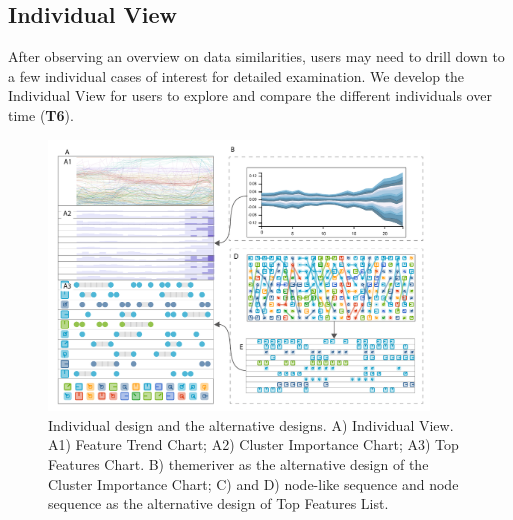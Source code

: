 \subsection{Individual View}
After observing an overview on data similarities, users may need to drill down to a few individual cases of interest for detailed examination.
We develop the Individual View for users to explore and compare the different individuals over time (\textbf{T6}).


\begin{figure}[t]
	\centering
    \includegraphics[width=0.90\textwidth]{figure/MultiRNNExplorer/design/alternative_design.pdf}
	\vspace{-3mm}
	\caption{Individual design and the alternative designs. A) Individual View. A1) Feature Trend Chart; A2) Cluster Importance Chart; A3) Top Features Chart. B) themeriver as the alternative design of the Cluster Importance Chart; C) and D) node-like sequence and node sequence as the alternative design of Top Features List.}
	\label{fig:individual_view}
	\vspace{-1mm}
\end{figure}


